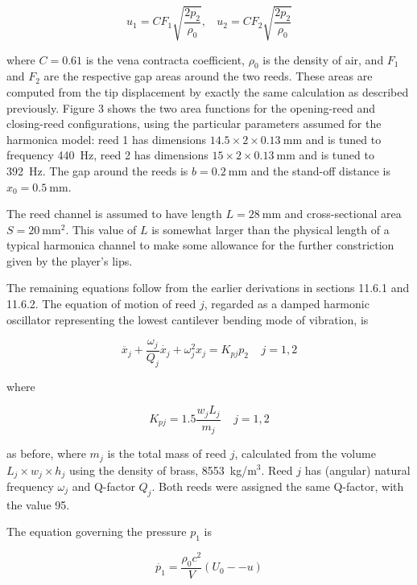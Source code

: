   $$u_1=CF_1 \sqrt{\dfrac{2p_2}{\rho_0}}, \mathrm{~~~~}u_2=CF_2 
  \sqrt{\dfrac{2p_2}{\rho_0}} \tag{3}$$ 

  where $C=0.61$ is the vena contracta coefficient, $\rho_0$ is the density of 
  air, and $F_1$ and $F_2$ are the respective gap areas around the two reeds. 
  These areas are computed from the tip displacement by exactly the same 
  calculation as described previously. Figure 3 shows the two area functions 
  for the opening-reed and closing-reed configurations, using the particular 
  parameters assumed for the harmonica model: reed 1 has dimensions $14.5 
  \times 2 \times 0.13 \mathrm{~mm}$ and is tuned to frequency 440~Hz, reed 2 
  has dimensions $15 \times 2 \times 0.13 \mathrm{~mm}$ and is tuned to 392~Hz. 
  The gap around the reeds is $b=0.2 \mathrm{~mm}$ and the stand-off distance 
  is $x_0=0.5 \mathrm{~mm}$. 


  The reed channel is assumed to have length $L=28 \mathrm{~mm}$ and 
  cross-sectional area $S=20 \mathrm{~mm}^2$. This value of $L$ is somewhat 
  larger than the physical length of a typical harmonica channel to make some 
  allowance for the further constriction given by the player's lips. 

  The remaining equations follow from the earlier derivations in sections 
  11.6.1 and 11.6.2. The equation of motion of reed $j$, regarded as a damped 
  harmonic oscillator representing the lowest cantilever bending mode of 
  vibration, is 

  $$\ddot{x_j}+\dfrac{\omega_j}{Q_j} \dot{x_j} +\omega_j^2 x_j = K_{pj} p_2 
  \mathrm{~~~~~} j=1,2 \tag{4}$$ 

  where 

  $$K_{pj} = 1.5 \dfrac{w_j L_j}{m_j} \mathrm{~~~~~} j=1,2 \tag{5}$$ 

  as before, where $m_j$ is the total mass of reed $j$, calculated from the 
  volume $L_j \times w_j \times h_j$ using the density of brass, 8553~kg/m$^3$. 
  Reed $j$ has (angular) natural frequency $\omega_j$ and Q-factor $Q_j$. Both 
  reeds were assigned the same Q-factor, with the value 95. 

  The equation governing the pressure $p_1$ is 

  $$\dot{p_1}=\dfrac{\rho_0 c^2}{V} (U_0 -- u) \tag{6}$$ 

